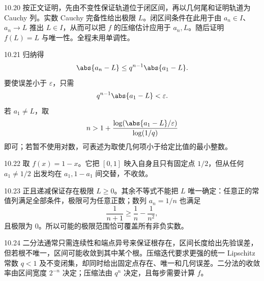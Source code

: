 \begin{solution}{10.20}
按正文证明，先由不变性保证轨道位于闭区间，再以几何尾和证明轨道为 Cauchy 列。实数 Cauchy 完备性给出极限 \(L\)。闭区间条件在此用于由 \(a_n\in I\)、\(a_n\to L\) 推出 \(L\in I\)，从而可以把 \(f\) 的压缩估计应用于 \(a_n,L\)。随后证明 \(f(L)=L\) 与唯一性。全程未用单调性。
\end{solution}

\begin{solution}{10.21}
归纳得
\[
 \abs{a_n-L}\le q^{n-1}\abs{a_1-L}.
\]
要使误差小于 \(\varepsilon\)，只需
\[
 q^{n-1}\abs{a_1-L}<\varepsilon.
\]
若 \(a_1\ne L\)，取
\[
 n>1+\frac{\log(\abs{a_1-L}/\varepsilon)}{\log(1/q)}
\]
即可；若暂不使用对数，可表述为取使几何项小于给定比值的最小整数。
\end{solution}

\begin{solution}{10.22}
取 \(f(x)=1-x\)。它把 \([0,1]\) 映入自身且只有固定点 \(1/2\)，但从任何 \(a_1\ne1/2\) 出发均在 \(a_1,1-a_1\) 间交替，不收敛。
\end{solution}

\begin{solution}{10.23}
正且递减保证存在极限 \(L\ge0\)。其余不等式不能把 \(L\) 唯一确定：任意正的常值列满足全部条件，极限可为任意正数；数列 \(a_n=1/n\) 也满足
\[
 \frac1{n+1}\ge\frac1n-\frac1{n^2},
\]
且极限为 \(0\)。所以可能的极限范围恰可覆盖所有非负实数。
\end{solution}

\begin{solution}{10.24}
二分法通常只需连续性和端点异号来保证根存在，区间长度给出先验误差，但若根不唯一，区间可能收敛到其中某个根。压缩迭代要求更强的统一 Lipschitz 常数 \(q<1\) 及不变闭集，却同时给出固定点存在、唯一和几何误差。二分法的收敛率由区间宽度 \(2^{-n}\) 决定；压缩法由 \(q^n\) 决定，且每步需要计算 \(f\)。
\end{solution}
